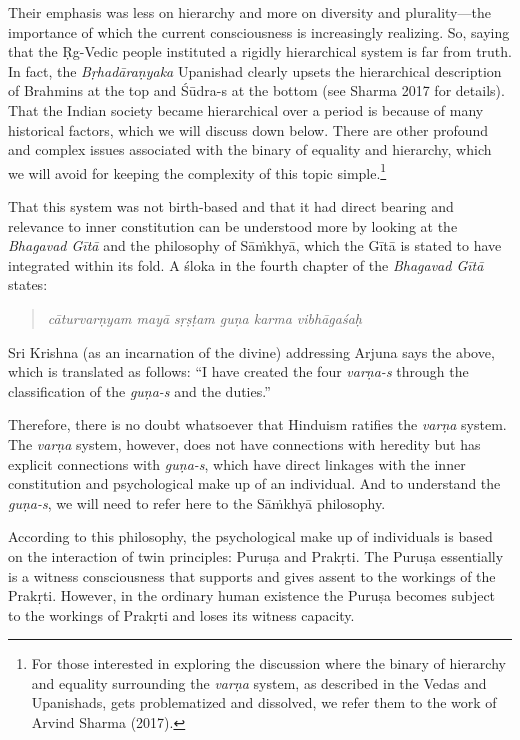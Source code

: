 Their emphasis was less on hierarchy and more on diversity and plurality—the importance of which the current consciousness is increasingly realizing. So, saying that the Ṛg-Vedic people instituted a rigidly hierarchical system is far from truth. In fact, the \textit{Bṛhadāraṇyaka} Upanishad clearly upsets the hierarchical description of Brahmins at the top and Śūdra-s at the bottom (see Sharma 2017 for details). That the Indian society became hierarchical over a period is because of many historical factors, which we will discuss down below. There are other profound and complex issues associated with the binary of equality and hierarchy, which we will avoid for keeping the complexity of this topic simple.\footnote{For those interested in exploring the discussion where the binary of hierarchy and equality surrounding the \textit{varṇa} 	system, as described in the Vedas and Upanishads, gets problematized and dissolved, we refer them to the work of Arvind Sharma (2017).}

That this system was not birth-based and that it had direct bearing and relevance to inner constitution can be understood more by looking at the \textit{Bhagavad Gītā} and the philosophy of Sāṁkhyā, which the Gītā is stated to have integrated within its fold. A śloka in the fourth chapter of the \textit{Bhagavad Gītā} states:

\begin{quote}
\textit{cāturvarṇyam mayā sṛṣṭam guṇa karma vibhāgaśaḥ} 
\end{quote}
Sri Krishna (as an incarnation of the divine) addressing Arjuna says the above, which is translated as follows: “I have created the four \textit{varṇa-s} through the classification of the \textit{guṇa-s} and the duties.”

Therefore, there is no doubt whatsoever that Hinduism ratifies the \textit{varṇa} system. The \textit{varṇa} system, however, does not have connections with heredity but has explicit connections with \textit{guṇa-s},  which have direct linkages with the inner constitution and psychological make up of an individual. And to understand the \textit{guṇa-s},  we will need to refer here to the Sāṁkhyā philosophy. 

According to this philosophy, the psychological make up of individuals is based on the interaction of twin principles: Puruṣa and Prakṛti. The Puruṣa essentially is a witness consciousness that supports and gives assent to the workings of the Prakṛti. However, in the ordinary human existence the Puruṣa becomes subject to the workings of Prakṛti and loses its witness capacity. 

